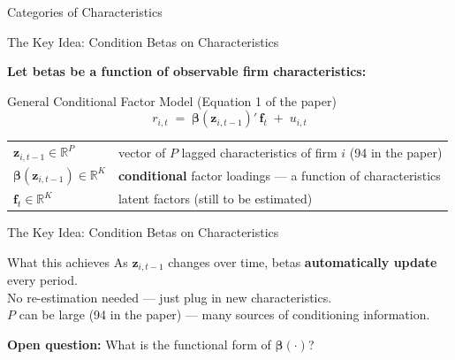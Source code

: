 \documentclass[aspectratio=169]{beamer}
\newcommand{\R}{\mathbb{R}}
\newcommand{\bz}{\bm{z}}
\newcommand{\bbeta}{\bm{\beta}}
\newcommand{\bff}{\bm{f}}
\begin{document}
\begin{frame}{Categories of Characteristics}
\medskip

\end{frame}
%
%
\begin{frame}{The Key Idea: Condition Betas on Characteristics}

\textbf{Let betas be a function of observable firm characteristics:}

\begin{block}{General Conditional Factor Model \normalfont(Equation 1 of the paper)}
\vspace{-0.5em}
\[
  r_{i,t} \;=\; \bbeta(\bz_{i,t-1})'\, \bff_t \;+\; u_{i,t}
\]
\vspace{-1em}
\end{block}

\medskip
\begin{tabular}{@{}ll@{}}
  $\bz_{i,t-1} \in \R^P$ & vector of $P$ lagged characteristics of firm $i$ \;(94 in the paper) \\[4pt]
  $\bbeta(\bz_{i,t-1}) \in \R^K$ & \textbf{conditional} factor loadings --- a function of characteristics \\[4pt]
  $\bff_t \in \R^K$ & latent factors (still to be estimated)
\end{tabular}
\end{frame}
%
%
\begin{frame}{The Key Idea: Condition Betas on Characteristics}
\begin{exampleblock}{What this achieves}
As $\bz_{i,t-1}$ changes over time, betas \textbf{automatically update} every period.\\
No re-estimation needed --- just plug in new characteristics.\\
$P$ can be large (94 in the paper) --- many sources of conditioning information.
\end{exampleblock}

\medskip
\centerline{\color{navy}\textbf{Open question:} What is the functional form of $\bbeta(\cdot)$?}

\end{frame}
%
%
\end{document}
